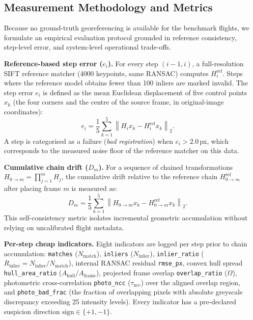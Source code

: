 \documentclass[conference]{IEEEtran}
\begin{document}
\subsection{Measurement Methodology and Metrics}
Because no ground-truth georeferencing is available for the benchmark flights, we
formulate an empirical evaluation protocol grounded in reference consistency,
step-level error, and system-level operational trade-offs.

\textbf{Reference-based step error ($e_i$).} For every step $(i-1, i)$, a full-resolution
SIFT reference matcher (4000 keypoints, same RANSAC) computes $H_i^{\mathrm{ref}}$.
Steps where the reference model obtains fewer than 100 inliers are marked invalid.
The step error $e_i$ is defined as the mean Euclidean displacement of five control
points $x_k$ (the four corners and the centre of the source frame, in original-image coordinates):
\begin{equation}
e_i = \frac{1}{5}\sum_{k=1}^{5}
\left\| H_i x_k - H_i^{\mathrm{ref}} x_k \right\|_2 .
\label{eq:step_error}
\end{equation}
A step is categorised as a failure (\emph{bad registration}) when $e_i > 2.0$\,px,
which corresponds to the measured noise floor of the reference matcher on this data.

\textbf{Cumulative chain drift ($D_m$).} For a sequence of chained transformations
$H_{0\to m} = \prod_{j=1}^m H_j$, the cumulative drift relative to the reference chain
$H_{0\to m}^{\mathrm{ref}}$ after placing frame $m$ is measured as:
\begin{equation}
D_m = \frac{1}{5}\sum_{k=1}^{5}
\left\| H_{0\to m} x_k - H_{0\to m}^{\mathrm{ref}} x_k \right\|_2 .
\label{eq:drift}
\end{equation}
This self-consistency metric isolates incremental geometric accumulation without
relying on uncalibrated flight metadata.

\textbf{Per-step cheap indicators.} Eight indicators are logged per step prior to
chain accumulation: \texttt{matches} ($N_{\mathrm{match}}$), \texttt{inliers} ($N_{\mathrm{inlier}}$),
\texttt{inlier\_ratio} ($R_{\mathrm{inlier}} = N_{\mathrm{inlier}} / N_{\mathrm{match}}$), internal
RANSAC residual \texttt{rmse\_px}, convex hull spread \texttt{hull\_area\_ratio}
($A_{\mathrm{hull}} / A_{\mathrm{frame}}$), projected frame overlap \texttt{overlap\_ratio} ($\Omega$),
photometric cross-correlation \texttt{photo\_ncc} ($\tau_{\mathrm{ncc}}$) over the aligned overlap
region, and \texttt{photo\_bad\_frac} (the fraction of overlapping pixels with absolute greyscale
discrepancy exceeding 25 intensity levels). Every indicator has a pre-declared suspicion direction
$\mathrm{sign} \in \{+1, -1\}$.
\end{document}
